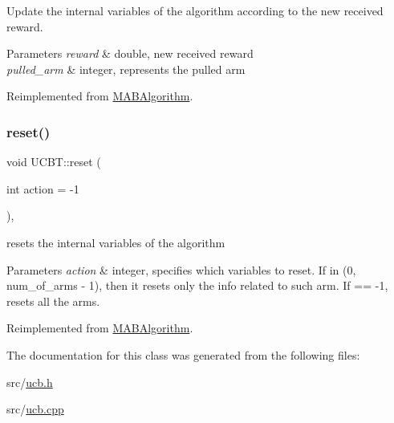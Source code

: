 Update the internal variables of the algorithm according to the new received reward. 


\begin{DoxyParams}{Parameters}
{\em reward} & double, new received reward \\
\hline
{\em pulled\+\_\+arm} & integer, represents the pulled arm \\
\hline
\end{DoxyParams}


Reimplemented from \mbox{\hyperlink{class_m_a_b_algorithm_aa584b3d6b86fa050e3389be9781b5782}{M\+A\+B\+Algorithm}}.

\mbox{\label{class_u_c_b_t_a4830934c071870d6f8680f90a247f9a7}} 
\subsubsection{\texorpdfstring{reset()}{reset()}}
{\footnotesize\ttfamily void U\+C\+B\+T\+::reset (\begin{DoxyParamCaption}\item[{int}]{action = {\ttfamily -\/1} }\end{DoxyParamCaption})\hspace{0.3cm}{\ttfamily [override]}, {\ttfamily [virtual]}}



resets the internal variables of the algorithm 


\begin{DoxyParams}{Parameters}
{\em action} & integer, specifies which variables to reset. If in (0, num\+\_\+of\+\_\+arms -\/ 1), then it resets only the info related to such arm. If == -\/1, resets all the arms. \\
\hline
\end{DoxyParams}


Reimplemented from \mbox{\hyperlink{class_m_a_b_algorithm_ad5761cee0b0e3421d1f043dbcc0b5f85}{M\+A\+B\+Algorithm}}.



The documentation for this class was generated from the following files\+:\begin{DoxyCompactItemize}
\item 
src/\mbox{\hyperlink{ucb_8h}{ucb.\+h}}\item 
src/\mbox{\hyperlink{ucb_8cpp}{ucb.\+cpp}}\end{DoxyCompactItemize}
